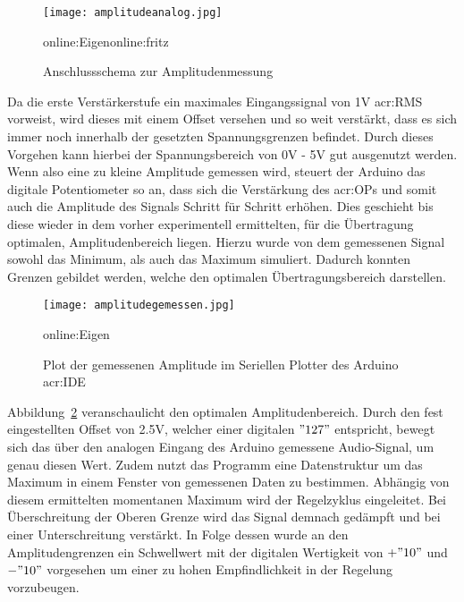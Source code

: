 \begin{figure}[H]
	\centering
	\texttt{[image: amplitudeanalog.jpg]}
	\caption[Anschlussschema zur Amplitudenmessung]{Anschlussschema zur Amplitudenmessung} 
	\gls{online:Eigen}\gls{online:fritz}
	\label{fig:amplitudeanalog}
\end{figure}

Da die erste Verstärkerstufe ein maximales Eingangssignal von 1V \gls{acr:RMS} vorweist, wird dieses mit einem Offset versehen und so weit verstärkt, dass es sich immer noch innerhalb der gesetzten Spannungsgrenzen befindet. Durch dieses Vorgehen kann hierbei der Spannungsbereich von 0V - 5V gut ausgenutzt werden. Wenn also eine zu kleine Amplitude gemessen wird, steuert der Arduino das digitale Potentiometer so an, dass sich die Verstärkung des \gls{acr:OP}s und somit auch die Amplitude des Signals Schritt für Schritt erhöhen. Dies geschieht bis diese wieder in dem vorher experimentell ermittelten, für die Übertragung optimalen, Amplitudenbereich liegen. Hierzu wurde von dem gemessenen Signal sowohl das Minimum, als auch das Maximum simuliert. Dadurch konnten Grenzen gebildet werden, welche den optimalen Übertragungsbereich darstellen. 

\begin{figure}[H]
	\centering
	\texttt{[image: amplitudegemessen.jpg]}
	\caption[Plot der gemessenen Amplitude im Seriellen Plotter der Arduino \gls{acr:IDE}]{Plot der gemessenen Amplitude im Seriellen Plotter des Arduino \gls{acr:IDE}} 
	\gls{online:Eigen}
	\label{fig:amplitudegemessen}
\end{figure}

Abbildung~\ref{fig:amplitudegemessen} veranschaulicht den optimalen Amplitudenbereich. Durch den fest eingestellten Offset von 2.5V, welcher einer digitalen $"127"$ entspricht, bewegt sich das über den analogen Eingang des Arduino gemessene Audio-Signal, um genau diesen Wert. Zudem nutzt das Programm eine Datenstruktur um das Maximum in einem Fenster von gemessenen Daten zu bestimmen. Abhängig von diesem ermittelten momentanen Maximum wird der Regelzyklus eingeleitet. Bei Überschreitung der Oberen Grenze wird das Signal demnach gedämpft und bei einer Unterschreitung verstärkt. In Folge dessen wurde an den Amplitudengrenzen ein Schwellwert mit der digitalen Wertigkeit von $+"10"$ und $-"10"$ vorgesehen um einer zu hohen Empfindlichkeit in der Regelung vorzubeugen.
 
\newpage
